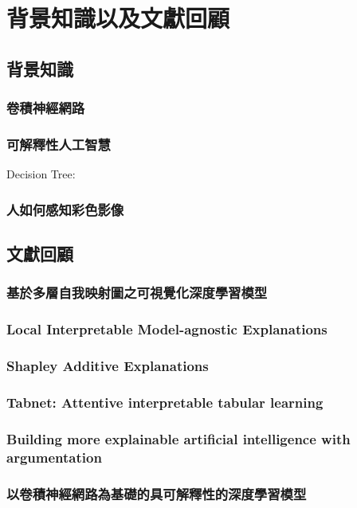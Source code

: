 \documentclass[class=NCU_thesis, crop=false]{standalone}
\begin{document}
\chapter{背景知識以及文獻回顧}
\section{背景知識}
\subsection{卷積神經網路}


\subsection{可解釋性人工智慧}
Decision Tree:
\cite{rokach2016decision}
\cite{grinsztajn2022treebased}

\subsection{人如何感知彩色影像}


\section{文獻回顧}
\subsection{基於多層自我映射圖之可視覺化深度學習模型}

\subsection{Local Interpretable Model-agnostic Explanations} 
\subsection{Shapley Additive Explanations}

\subsection{Tabnet: Attentive interpretable tabular learning}
\subsection{Building more explainable artificial intelligence with argumentation}
\subsection{以卷積神經網路為基礎的具可解釋性的深度學習模型}
\end{document}
